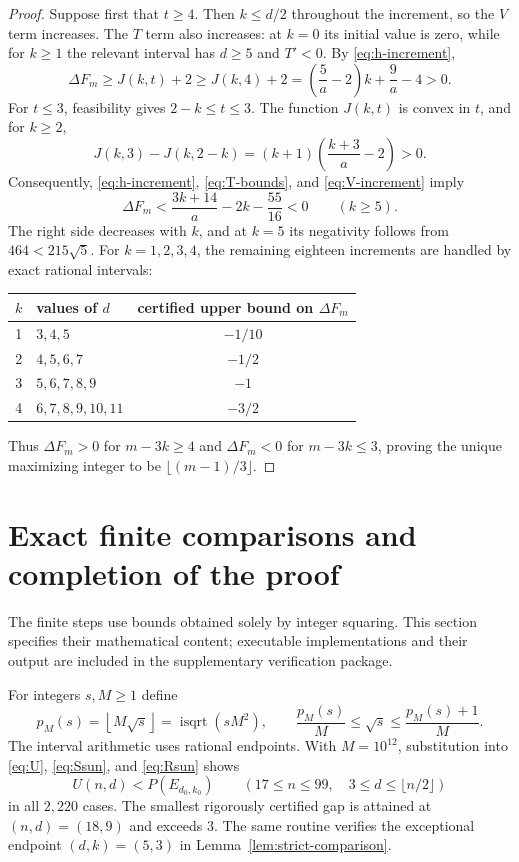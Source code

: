 \documentclass[11pt,a4paper]{article}
\numberwithin{equation}{section}
\newcommand{\floor}[1]{\left\lfloor #1\right\rfloor}
\begin{document}
\begin{proof}
Suppose first that $t\ge4$. Then $k\le d/2$ throughout the increment, so the $V$ term increases. The $T$ term also increases: at $k=0$ its initial value is zero, while for $k\ge1$ the relevant interval has $d\ge5$ and $T'<0$. By \eqref{eq:h-increment},
\[
\Delta F_m\ge J(k,t)+2\ge J(k,4)+2
=\left(\frac5a-2\right)k+\frac9a-4>0.
\]
For $t\le3$, feasibility gives $2-k\le t\le3$. The function $J(k,t)$ is convex in $t$, and for $k\ge2$,
\[J(k,3)-J(k,2-k)=(k+1)\left(\frac{k+3}{a}-2\right)>0.\]
Consequently, \eqref{eq:h-increment}, \eqref{eq:T-bounds}, and \eqref{eq:V-increment} imply
\[
\Delta F_m<\frac{3k+14}a-2k-\frac{55}{16}<0\qquad(k\ge5).
\]
The right side decreases with $k$, and at $k=5$ its negativity follows from $464<215\sqrt5$. For $k=1,2,3,4$, the remaining eighteen increments are handled by exact rational intervals:
\begin{center}\small
\begin{tabular}{@{}c l c@{}}\toprule
$k$ & values of $d$ & certified upper bound on $\Delta F_m$\\\midrule
1 & $3,4,5$ & $-1/10$\\
2 & $4,5,6,7$ & $-1/2$\\
3 & $5,6,7,8,9$ & $-1$\\
4 & $6,7,8,9,10,11$ & $-3/2$\\\bottomrule
\end{tabular}
\end{center}
Thus $\Delta F_m>0$ for $m-3k\ge4$ and $\Delta F_m<0$ for $m-3k\le3$, proving the unique maximizing integer to be $\lfloor(m-1)/3\rfloor$.
\end{proof}

\section{Exact finite comparisons and completion of the proof}\label{sec:certificate}
The finite steps use bounds obtained solely by integer squaring. This section specifies their mathematical content; executable implementations and their output are included in the supplementary verification package.

For integers $s,M\ge1$ define
\begin{equation}\label{eq:floor-root}
p_M(s)=\floor{M\sqrt{s}}=\operatorname{isqrt}(sM^2),\qquad
\frac{p_M(s)}M\le\sqrt{s}\le\frac{p_M(s)+1}M.
\end{equation}
The interval arithmetic uses rational endpoints. With $M=10^{12}$, substitution into \eqref{eq:U}, \eqref{eq:Ssun}, and \eqref{eq:Rsun} shows
\[
U(n,d)<P(E_{d_0,k_0})\qquad
(17\le n\le99,\quad 3\le d\le\lfloor n/2\rfloor)
\]
in all $2{,}220$ cases. The smallest rigorously certified gap is attained at $(n,d)=(18,9)$ and exceeds $3$. The same routine verifies the exceptional endpoint $(d,k)=(5,3)$ in Lemma~\ref{lem:strict-comparison}.
\end{document}
